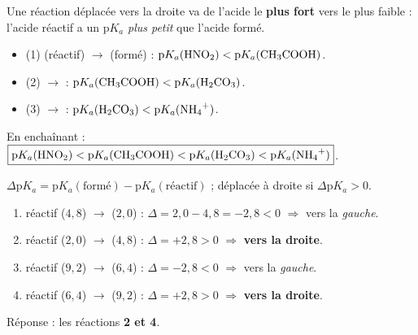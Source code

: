 \documentclass[11pt,a4paper]{article}
\begin{document}

\begin{corrige}
Une réaction déplacée vers la droite va de l'acide le \textbf{plus fort} vers le plus faible : l'acide réactif
a un $\mathrm{p}K_a$ \emph{plus petit} que l'acide formé.
\begin{itemize}[leftmargin=1.4em,topsep=2pt,itemsep=1.5pt]
  \item (1)  (réactif) $\to$  (formé) : $\mathrm{p}K_a(\ce{HNO2}) < \mathrm{p}K_a(\ce{CH3COOH})$.
  \item (2)  $\to$  : $\mathrm{p}K_a(\ce{CH3COOH}) < \mathrm{p}K_a(\ce{H2CO3})$.
  \item (3)  $\to$  : $\mathrm{p}K_a(\ce{H2CO3}) < \mathrm{p}K_a(\ce{NH4+})$.
\end{itemize}
En enchaînant : $\boxed{\mathrm{p}K_a(\ce{HNO2}) < \mathrm{p}K_a(\ce{CH3COOH}) < \mathrm{p}K_a(\ce{H2CO3}) < \mathrm{p}K_a(\ce{NH4+})}$.
\end{corrige}

\begin{corrige}
$\Delta\mathrm{p}K_a = \mathrm{p}K_a(\text{formé}) - \mathrm{p}K_a(\text{réactif})$ ; déplacée à droite si
$\Delta\mathrm{p}K_a > 0$.
\begin{enumerate}[label=\arabic*)]
  \item réactif  ($4{,}8$) $\to$  ($2{,}0$) : $\Delta = 2{,}0 - 4{,}8 = -2{,}8 < 0$ $\Rightarrow$ vers la \emph{gauche}.
  \item réactif  ($2{,}0$) $\to$  ($4{,}8$) : $\Delta = +2{,}8 > 0$ $\Rightarrow$ \textbf{vers la droite}.
  \item réactif  ($9{,}2$) $\to$  ($6{,}4$) : $\Delta = -2{,}8 < 0$ $\Rightarrow$ vers la \emph{gauche}.
  \item réactif  ($6{,}4$) $\to$  ($9{,}2$) : $\Delta = +2{,}8 > 0$ $\Rightarrow$ \textbf{vers la droite}.
\end{enumerate}
Réponse : les réactions \textbf{2 et 4}.
\end{corrige}
\end{document}
